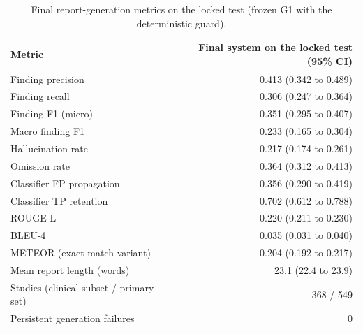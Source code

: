 \begin{table}[t]
\centering
\scriptsize
\begin{tabular}{lr}
\hline
Metric & Final system on the locked test (95\% CI) \\
\hline
Finding precision & 0.413 (0.342 to 0.489) \\
Finding recall & 0.306 (0.247 to 0.364) \\
Finding F1 (micro) & 0.351 (0.295 to 0.407) \\
Macro finding F1 & 0.233 (0.165 to 0.304) \\
Hallucination rate & 0.217 (0.174 to 0.261) \\
Omission rate & 0.364 (0.312 to 0.413) \\
Classifier FP propagation & 0.356 (0.290 to 0.419) \\
Classifier TP retention & 0.702 (0.612 to 0.788) \\
ROUGE-L & 0.220 (0.211 to 0.230) \\
BLEU-4 & 0.035 (0.031 to 0.040) \\
METEOR (exact-match variant) & 0.204 (0.192 to 0.217) \\
Mean report length (words) & 23.1 (22.4 to 23.9) \\
Studies (clinical subset / primary set) & 368 / 549 \\
Persistent generation failures & 0 \\
\hline
\end{tabular}
\caption{Final report-generation metrics on the locked test (frozen G1 with the deterministic guard).}
\label{tab:table5_final_report_generation_metrics}
\end{table}
